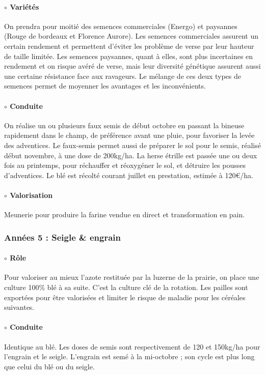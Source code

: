 \documentclass{book}
\begin{document}
\paragraph{$\circ$ Variétés} On prendra pour moitié des semences commerciales (Energo) et paysannes (Rouge de bordeaux et Florence Aurore). Les semences commerciales assurent un certain rendement et permettent d'éviter les problème de verse par leur hauteur de taille limitée. Les semences paysannes, quant à elles, sont plus incertaines en rendement et on risque avéré de verse, mais leur diversité génétique assurent aussi une certaine résistance face aux ravageurs. Le mélange de ces deux types de semences permet de moyenner les avantages et les inconvénients. 

\paragraph{$\circ$ Conduite} On réalise un ou plusieurs faux semis de début octobre en passant la bineuse rapidement dans le champ, de préférence avant une pluie, pour favoriser la levée des adventices. Le faux-semis permet aussi de préparer le sol pour le semis, réalisé début novembre, à une dose de 200kg/ha. La herse étrille est passée une ou deux fois au printemps, pour réchauffer et réoxygéner le sol, et détruire les pousses d'adventices. Le blé est récolté courant juillet en prestation, estimée à 120\euro{}/ha. 

\paragraph{$\circ$ Valorisation} Meunerie pour produire la farine vendue en direct et transformation en pain.

\subsubsection{Années 5 : Seigle \& engrain}

\paragraph{$\circ$ Rôle} Pour valoriser au mieux l'azote restituée par la luzerne de la prairie, on place une culture 100\% blé à sa suite. C'est la culture clé de la rotation. Les pailles sont exportées pour être valorisées et limiter le risque de maladie pour les céréales suivantes.

\paragraph{$\circ$ Conduite} Identique au blé. Les doses de semis sont respectivement de 120 et 150kg/ha pour l'engrain et le seigle. L'engrain est semé à la mi-octobre ; son cycle est plus long que celui du blé ou du seigle.
\end{document}
